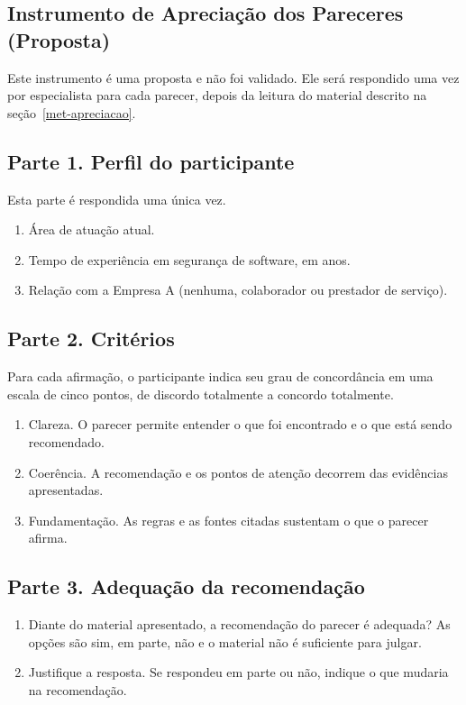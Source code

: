 \begin{apendicesenv}
\chapter{Instrumento de Apreciação dos Pareceres (Proposta)}
\label{ap-instrumento}

Este instrumento é uma proposta e não foi validado. Ele será respondido uma vez por especialista para cada parecer, depois da leitura do material descrito na seção~\ref{met-apreciacao}.

\section*{Parte 1. Perfil do participante}

Esta parte é respondida uma única vez.

\begin{enumerate}
    \item Área de atuação atual.
    \item Tempo de experiência em segurança de software, em anos.
    \item Relação com a Empresa A (nenhuma, colaborador ou prestador de serviço).
\end{enumerate}

\section*{Parte 2. Critérios}

Para cada afirmação, o participante indica seu grau de concordância em uma escala de cinco pontos, de discordo totalmente a concordo totalmente.

\begin{enumerate}
    \item Clareza. O parecer permite entender o que foi encontrado e o que está sendo recomendado.
    \item Coerência. A recomendação e os pontos de atenção decorrem das evidências apresentadas.
    \item Fundamentação. As regras e as fontes citadas sustentam o que o parecer afirma.
\end{enumerate}

\section*{Parte 3. Adequação da recomendação}

\begin{enumerate}
    \item Diante do material apresentado, a recomendação do parecer é adequada? As opções são sim, em parte, não e o material não é suficiente para julgar.
    \item Justifique a resposta. Se respondeu em parte ou não, indique o que mudaria na recomendação.
\end{enumerate}


\end{apendicesenv}
